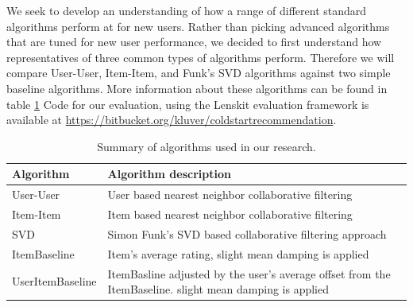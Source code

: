 \documentclass[letterpaper]{sig-alternate}
\begin{document}
  We seek to develop an understanding of how a range of different standard algorithms perform at for new users.
  Rather than picking advanced algorithms that are tuned for new user performance, we decided to first understand how representatives of three common types of algorithms perform.
  Therefore we will compare User-User, Item-Item, and Funk's SVD algorithms against two simple baseline algorithms.
  More information about these algorithms can be found in table \ref{tbl:algo}
  Code for our evaluation, using the Lenskit evaluation framework \cite{lenskit} is available at \url{https://bitbucket.org/kluver/coldstartrecommendation}.
  
  \begin{table}
    \centering
    \begin{tabular}{|p{6em}|p{18em}|}
      \hline
      Algorithm        & Algorithm description                                                                                     \\\hline
      User-User        & User based nearest neighbor collaborative filtering \cite{resnick1994grouplens}                           \\\hline
      Item-Item        & Item based nearest neighbor collaborative filtering \cite{sarwar2001item}                                 \\\hline
      SVD              & Simon Funk's SVD based collaborative filtering approach \cite{funk_netflix_2006}                          \\\hline
      ItemBaseline     & Item's average rating, slight mean damping is applied                                                     \\\hline
      UserItem\-Baseline & ItemBasline adjusted by the user's average offset from the ItemBaseline. slight mean damping is applied \\\hline
    \end{tabular}
    \caption{Summary of algorithms used in our research.}
    \label{tbl:algo}
  \end{table}

  
\end{document}
